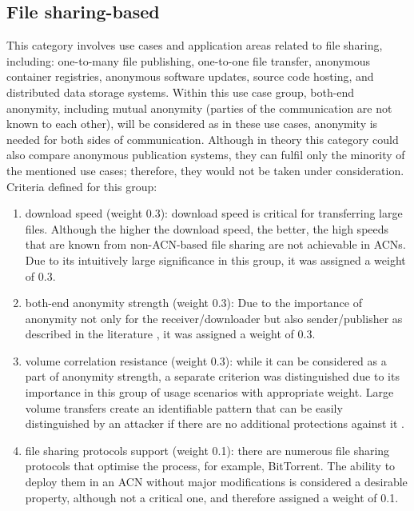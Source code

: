 \subsection{File sharing-based}
This category involves use cases and application areas related to file sharing, including: one-to-many file publishing, one-to-one file transfer, anonymous container registries, anonymous software updates, source code hosting, and distributed data storage systems.
Within this use case group, both-end anonymity, including mutual anonymity (parties of the communication are not known to each other), will be considered as in these use cases, anonymity is needed for both sides of communication.
Although in theory this category could also compare anonymous publication systems, they can fulfil only the minority of the mentioned use cases; therefore, they would not be taken under consideration.
Criteria defined for this group:
\begin{enumerate}
    \item download speed (weight 0.3): download speed is critical for transferring large files. Although the higher the download speed, the better, the high speeds that are known from non-ACN-based file sharing are not achievable in ACNs. Due to its intuitively large significance in this group, it was assigned a weight of 0.3.
    \item both-end anonymity strength (weight 0.3): Due to the importance of anonymity not only for the receiver/downloader but also sender/publisher as described in the literature \cite{rewebber, freehaven}, it was assigned a weight of 0.3.
    \item volume correlation resistance (weight 0.3): while it can be considered as a part of anonymity strength, a separate criterion was distinguished due to its importance in this group of usage scenarios with appropriate weight. Large volume transfers create an identifiable pattern that can be easily distinguished by an attacker if there are no additional protections against it \cite{tor-design}.
    \item file sharing protocols support (weight 0.1): there are numerous file sharing protocols that optimise the process, for example, BitTorrent. The ability to deploy them in an ACN without major modifications is considered a desirable property, although not a critical one, and therefore assigned a weight of 0.1.
\end{enumerate}

